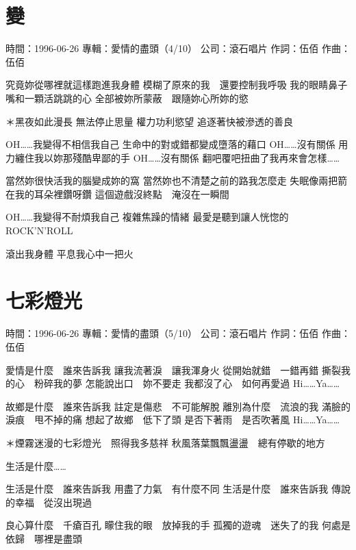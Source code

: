 \documentclass[UTF8,a4paper,oneside,twocolumn,12pt]{ctexbook}
\newcommand{\infopair}[2]{\textbullet #1：#2}
\newcommand{\zc}[1][伍佰]{\infopair{作詞}{#1}}
\newcommand{\zq}[1][伍佰]{\infopair{作曲}{#1}}
\newcommand{\zj}[1]{\infopair{專輯}{#1}}
\newcommand{\sj}[1]{\infopair{時間}{#1}}
\newcommand{\gs}[1]{\infopair{公司}{#1}}
\newenvironment{info}{\begin{flushleft}\kaishu
	}
	{\end{flushleft}\normalsize\yahei\par}
\newenvironment{lyric}{
	}
{}
\begin{document}
\section{變}
\begin{info}
	\sj{1996-06-26}
	\zj{愛情的盡頭（4/10）}
	\gs{滾石唱片}
	\zc
	\zq
\end{info}
\begin{lyric}
	究竟妳從哪裡就這樣跑進我身體
	模糊了原來的我　還要控制我呼吸
	我的眼睛鼻子嘴和一顆活跳跳的心
	全部被妳所蒙蔽　跟隨妳心所妳的慾

	＊黑夜如此漫長
	無法停止思量
	權力功利慾望
	追逐著快被滲透的善良

	OH……我變得不相信我自己
	生命中的對或錯都變成墮落的藉口
	OH……沒有關係
	用力纏住我以妳那殘酷卑鄙的手
	OH……沒有關係
	翻吧覆吧扭曲了我再來會怎樣……

	當然妳很快活我的腦變成妳的窩
	當然妳也不清楚之前的路我怎麼走
	失眠像兩把箭在我的耳朵裡鑽呀鑽
	這個遊戲沒終點　淹沒在一瞬間

	OH……我變得不耐煩我自己
	複雜焦躁的情緒
	最愛是聽到讓人恍惚的ROCK'N'ROLL

	滾出我身體
	平息我心中一把火
\end{lyric}

\section{七彩燈光}
\begin{info}
	\sj{1996-06-26}
	\zj{愛情的盡頭（5/10）}
	\gs{滾石唱片}
	\zc
	\zq
\end{info}
\begin{lyric}
	愛情是什麼　誰來告訴我
	讓我流著淚　讓我渾身火
	從開始就錯　一錯再錯
	撕裂我的心　粉碎我的夢
	怎能說出口　妳不要走
	我都沒了心　如何再愛過
	Hi……Ya……

	故鄉是什麼　誰來告訴我
	註定是傷悲　不可能解脫
	離別為什麼　流浪的我
	滿臉的淚痕　甩不掉的痛
	想起了故鄉　低下了頭
	是否下著雨　是否吹著風
	Hi……Ya……

	＊煙霧迷漫的七彩燈光　照得我多慈祥
	秋風落葉飄飄盪盪　總有停歇的地方

	生活是什麼……

	生活是什麼　誰來告訴我
	用盡了力氣　有什麼不同
	生活是什麼　誰來告訴我
	傳說的幸福　從沒出現過

	良心算什麼　千瘡百孔
	矇住我的眼　放掉我的手
	孤獨的遊魂　迷失了的我
	何處是依歸　哪裡是盡頭
\end{lyric}
\end{document}
